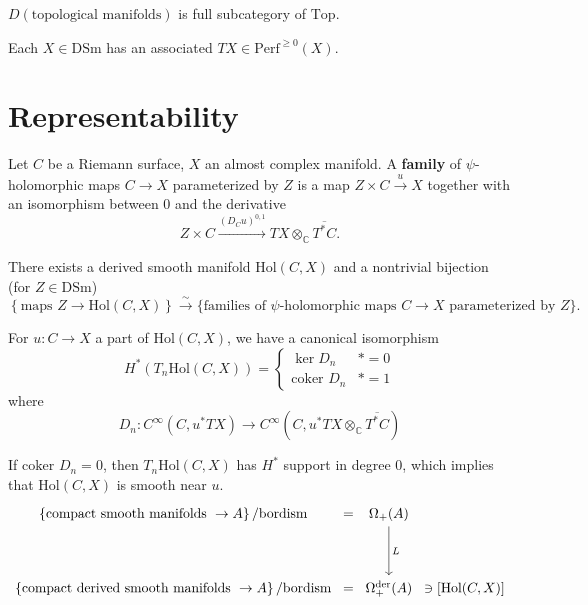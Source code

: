 \begin{remark}

$D(\text{topological manifolds})$ is full subcategory of $\text{Top}$.

\end{remark}

Each $X\in \text{DSm}$ has an associated $TX\in \text{Perf}^{\ge 0} (X)$.

\section{Representability}

\begin{definition}

Let $C$ be a Riemann surface, $X$ an almost complex manifold. A \textbf{family} of $\psi$-holomorphic maps $C\to X$ parameterized by $Z$ is a map $Z\times C \stackrel{u}{\longrightarrow} X$ together with an isomorphism between $0$ and the derivative
\[
Z\times C \stackrel{(D_{C}u)^{0,1}}{\longrightarrow}TX\otimes_{\mathbb{C}} \overline{T^*C}.
\]

\end{definition}

\begin{theorem}

There exists a derived smooth manifold $\text{Hol}(C,X)$ and a nontrivial bijection (for $Z\in \text{DSm}$)
\[
\left\{ \text{maps }Z\to \text{Hol}(C,X)\right\}\stackrel{\sim}{\to} \{\text{families of }\psi\text{-holomorphic maps } C\to X \text{ parameterized by } Z\}.
\]

\end{theorem}

\begin{remark}

For $u: C\to X$ a part of $\text{Hol}(C,X)$, we have a canonical isomorphism
\[
H^*(T_n \text{Hol}(C,X))=\begin{cases} \ker D_n & *=0 \\ \text{coker }D_n & *=1 \end{cases}
\]
where
\[
D_n :C^\infty(C, u^* TX) \to C^\infty(C, u^* TX\otimes_{\mathbb{C}} \overline{T^* C})
\]

\end{remark}

\begin{example}

If $\text{coker }D_n=0$, then $T_n \text{Hol}(C,X)$ has $H^*$ support in degree $0$, which implies that $\text{Hol}(C,X)$ is smooth near $u$.
\[\begin{tikzcd}[column sep=0pt]
	{\left\{ \text{compact smooth manifolds }\to A\right\}/\text{bordism}} & {=} & {\Omega_+(A)} \\
	\\
	{\left\{\text{compact derived smooth manifolds }\to A\right\}/\text{bordism}} & {=} & {\Omega_+^{\text{der}}(A)} & {\ni \left[\text{Hol}(C,X)\right]}
	\arrow["L", from=1-3, to=3-3]
\end{tikzcd}\]

\end{example}

